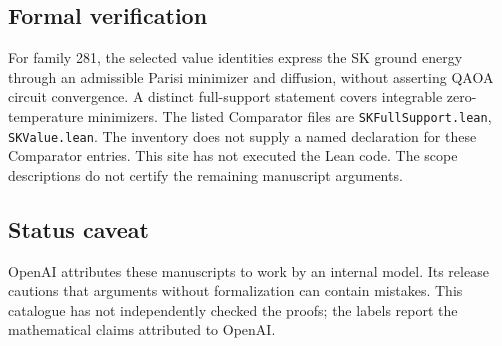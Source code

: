 \documentclass[11pt]{article}
\begin{document}
\subsection{Formal verification}
For family 281, the selected value identities express the SK ground energy through an admissible Parisi minimizer and diffusion, without asserting QAOA circuit convergence. A distinct full-support statement covers integrable zero-temperature minimizers. The listed Comparator files are \texttt{SKFullSupport.lean}, \texttt{SKValue.lean}. The inventory does not supply a named declaration for these Comparator entries. This site has not executed the Lean code. The scope descriptions do not certify the remaining manuscript arguments.

\subsection{Status caveat}
OpenAI attributes these manuscripts to work by an internal model. Its release cautions that arguments without formalization can contain mistakes. This catalogue has not independently checked the proofs; the labels report the mathematical claims attributed to OpenAI.
\end{document}
